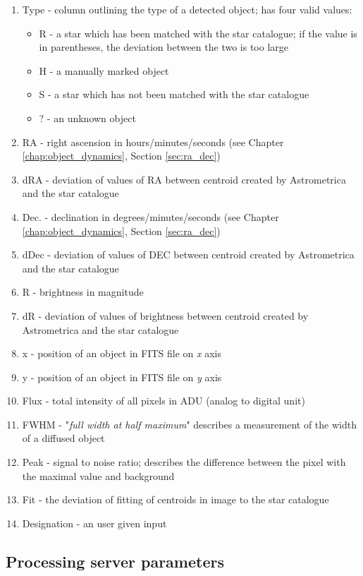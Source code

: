 	\begin{enumerate}
		\item Type - column outlining the type of a detected object; has four valid values:
		\begin{itemize}
			\item R - a star which has been matched with the star catalogue; if the value is in parentheses, the deviation between the two is too large
			\item H - a manually marked object
			\item S - a star which has not been matched with the star catalogue
			\item ? - an unknown object
		\end{itemize}
		\item RA - right ascension in hours/minutes/seconds (see Chapter \ref{chap:object_dynamics}, Section \ref{sec:ra_dec})
		\item dRA - deviation of values of RA between centroid created by Astrometrica and the star catalogue
		\item Dec. - declination in degrees/minutes/seconds (see Chapter \ref{chap:object_dynamics}, Section \ref{sec:ra_dec})
		\item dDec - deviation of values of DEC between centroid created by Astrometrica and the star catalogue
		\item R - brightness in magnitude
		\item dR - deviation of values of brightness between centroid created by Astrometrica and the star catalogue
		\item x - position of an object in FITS file on \emph{x} axis
		\item y - position of an object in FITS file on \emph{y} axis
		\item Flux - total intensity of all pixels in ADU (analog to digital unit)
		\item FWHM - "\emph{full width at half maximum}" describes a measurement of the width of a diffused object
		\item Peak - signal to noise ratio; describes the difference between the pixel with the maximal value and background
		\item Fit - the deviation of fitting of centroids in image to the star catalogue
		\item Designation - an user given input
	\end{enumerate}
	
\subsection{Processing server parameters}\label{sec:server_param}

